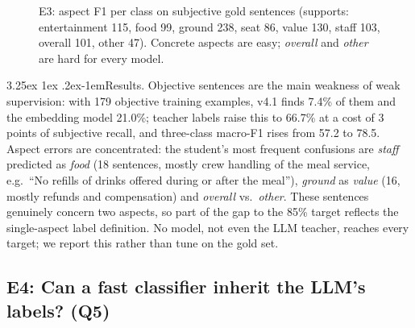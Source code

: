 \documentclass[10pt,twocolumn,a4paper]{article}
\makeatletter
\renewcommand\paragraph{\@startsection{paragraph}{4}{\parindent}%
  {3.25ex \@plus 1ex \@minus .2ex}{-1em}{\normalfont\normalsize\bfseries}}
\makeatother
\begin{document}
\begin{figure}[t]
\centering
{}
\caption{E3: aspect F1 per class on subjective gold sentences (supports: entertainment 115, food 99, ground 238, seat 86,
value 130, staff 103, overall 101, other 47). Concrete aspects are easy; \emph{overall} and \emph{other} are hard for
every model.}
\label{fig:aspect}
\end{figure}

\paragraph{Results.} Objective sentences are the main weakness of weak supervision: with 179 objective training
examples, v4.1 finds 7.4\% of them and the embedding model 21.0\%; teacher labels raise this to 66.7\% at a cost of 3
points of subjective recall, and three-class macro-F1 rises from 57.2 to 78.5. Aspect errors are concentrated: the
student's most frequent confusions are \emph{staff} predicted as \emph{food} (18 sentences, mostly crew handling of the
meal service, e.g.\ ``No refills of drinks offered during or after the meal''), \emph{ground} as \emph{value} (16,
mostly refunds and compensation) and \emph{overall} vs.\ \emph{other}. These sentences genuinely concern two aspects,
so part of the gap to the 85\% target reflects the single-aspect label definition. No model, not even the LLM teacher,
reaches every target; we report this rather than tune on the gold set.

\subsection{E4: Can a fast classifier inherit the LLM's labels? (Q5)}
\label{sec:exp-distill}
\end{document}

